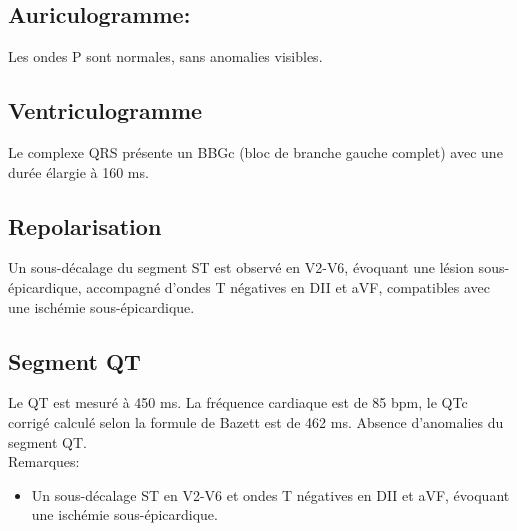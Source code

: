 \documentclass[12pt,a4paper]{article}%
\begin{document}
\subsection*{Auriculogramme:}%
\label{subsec:Auriculogramme}%

%
Les ondes P sont normales, sans anomalies visibles.%
\subsection*{Ventriculogramme}%
\label{subsec:Ventriculogramme}%

%
Le complexe QRS présente un BBGc (bloc de branche gauche complet) avec une durée élargie à 160 ms.%
\subsection*{Repolarisation}%
\label{subsec:Repolarisation}%

%
Un sous{-}décalage du segment ST est observé en V2{-}V6, évoquant une lésion sous{-}épicardique, accompagné d’ondes T négatives en DII et aVF, compatibles avec une ischémie sous{-}épicardique.%
\subsection*{Segment QT}%
\label{subsec:SegmentQT}%

%
Le QT est mesuré à 450 ms. La fréquence cardiaque est de 85 bpm, le QTc corrigé calculé selon la formule de Bazett est de 462 ms. Absence d’anomalies du segment QT.%
\\%
%
\vspace*{\baselineskip}%
Remarques:%
\begin{itemize}%
\setlength{\itemsep}{0pt}%
\item%
Un sous{-}décalage ST en V2{-}V6 et ondes T négatives en DII et aVF, évoquant une ischémie sous{-}épicardique.%
\end{itemize}%
%
\vspace*{\baselineskip}%
\end{document}
